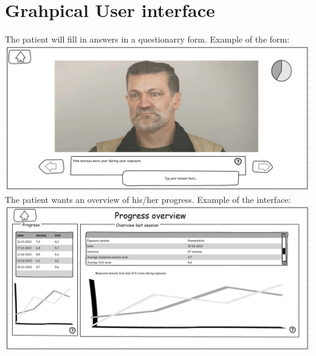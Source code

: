\chapter{Grahpical User interface}
The patient will fill in answers in a questionarry form. Example of the form: \newline
\includegraphics[width=\textwidth]{"GUI mockup/questionaire form"}
The patient wants an overview of his/her progress. Example of the interface: \newline
\includegraphics[width=\textwidth]{"GUI mockup/overview"}